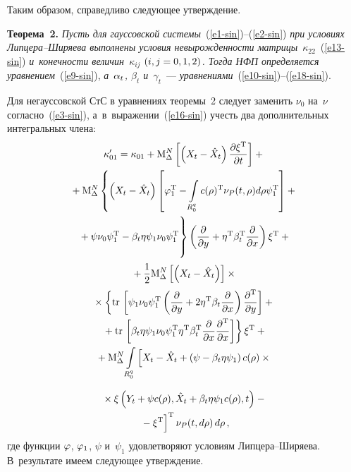 \begin{multicols}{2}
Таким образом, справедливо следующее утверж\-дение.

\smallskip

\noindent
\textbf{Теорема~2.} \textit{Пусть для гауссовской системы}~(\ref{e1-sin})--(\ref{e2-sin}) \textit{при условиях Лип\-це\-ра--Ши\-ря\-ева выполнены условия невырожденности матрицы}~$\kappa_{22}$~(\ref{e13-sin}) \textit{и~конечности величин~$\kappa_{ij}$ $(i,j\hm=0,1,2)$. Тогда НФП определяется уравнением}~(\ref{e9-sin}), \textit{а~$\alpha_t$, $\beta_t$ и~$\gamma_t$}~--- \textit{уравнениями}~(\ref{e10-sin})--(\ref{e18-sin}).

\smallskip

Для негауссовской СтС в уравнениях теоремы~2 следует заменить  $\nu_0$ на~$\nu$ согласно~(\ref{e3-sin}), а~в~выражении~(\ref{e16-sin}) учесть два дополнительных интегральных члена:
        \begin{multline*}
    \kappa_{01}'  =\kappa_{01} + \mathrm{M}^N_\Delta  \left[ \left(X_t - \hat X_t\right) \fr{\partial\xi^{\mathrm{T}}}{\partial t} \right] +{}\\
    {}+\mathrm{M}^N_\Delta  \left\{ \left(X_t -\hat X_t\right) \left[ \vrp_1^{\mathrm{T}} -\iii_{R_0^q} c(\rho)^{\mathrm{T}} \nu_P (t,\rho) d\rho \psi_1^{\mathrm{T}} \right] +{}\right.\\
\left.{}+ \psi \nu_0 \psi_1^{\mathrm{T}} - \beta_t \eta \psi_1 \nu_0\psi_1^{\mathrm{T}}
\vphantom{\iii_{R_0^q}}\right\} \left( \fr{\partial}{\partial y} + \eta^{\mathrm{T}} \beta_t^{\mathrm{T}} \fr{\partial}{\partial x}\right) \xi^{\mathrm{T}}+ {}\\
{}+\fr{1}{2} \mathrm{M}^N_\Delta  \left[ \left(X_t -\hat X_t\right)\right] \times{}\\
{}\times\left\{ \mathrm{tr}\, \left[ \psi_1 \nu_0 \psi_1^{\mathrm{T}} \left( \fr{\partial}{\partial y} + 2 \eta^{\mathrm{T}} \beta_t \fr{\partial}{\partial x} \right)\fr{\partial^{\mathrm{T}}}{\partial y} \right]+{}\right.\\
\left.{}+
   \mathrm{tr}\, \left[ \beta_t \eta \psi_1 \nu_0\psi_1^{\mathrm{T}} \eta^{\mathrm{T}} \beta_t^{\mathrm{T}} \fr{\partial}{\partial x} \fr{\partial^{\mathrm{T}}}{\partial x} \right] \right\} \xi^{\mathrm{T}} +{}\\
{}+ \mathrm{M}^N_\Delta \iii_{R_0^q}  \left[ X_t -\hat{X}_t + \left(\psi -\beta_t \eta \psi_1\right) c (\rho) \times{}\right.
\end{multline*}

\noindent
\begin{multline}
{}\times \xi \left(Y_t +\psi c(\rho), \hat{X}_t + \beta_t \eta \psi_1 c(\rho), t\right) -{}\\
\left.{}-\xi^{\mathrm{T}}
\vphantom{\left[ X_t -\hat{X}_t + \left(\psi -\beta_t \eta \psi_1\right) c (\rho) \times{}\right.}
\right]^{\mathrm{T}} \nu_P (t, d\rho)\, d\rho\,,\label{e19-sin}
\end{multline}
где функции $\varphi$, $\varphi_1$, $\psi$ и~$\psi_1$ удовлетворяют условиям Лип\-це\-ра--Ши\-ря\-ева. В~результате имеем следующее утверждение.


\end{multicols}
